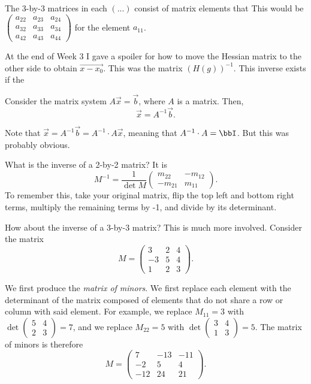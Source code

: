 \documentclass[a4paper, 12pt,oneside,openany]{book}
\begin{document}
The 3-by-3 matrices in each $(...)$ consist of matrix elements that  This would be $\begin{pmatrix} a_{22} & a_{23} & a_{24} \\ a_{32} & a_{33} & a_{34} \\ a_{42} & a_{43} & a_{44} \end{pmatrix}$ for the element $a_{11}$.

At the end of Week 3 I gave a spoiler for how to move the Hessian matrix to the other side to obtain $\overrightarrow{x-x_0}$. This was the matrix $(H(g))^{-1}$. This inverse exists if the 

Consider the matrix system $A\vec{x} = \vec{b}$, where $A$ is a matrix. Then, $$\vec{x} = A^{-1} \vec{b}.$$

Note that $\vec{x} = A^{-1} \vec{b} = A^{-1} \cdot A\vec{x}$, meaning that $A^{-1} \cdot A = \bbI$. But this was probably obvious. 

What is the inverse of a 2-by-2 matrix? It is $$M^{-1} = \frac{1}{\det{M}} \begin{pmatrix} m_{22} & -m_{12} \\ -m_{21} & m_{11}\end{pmatrix}.$$ To remember this, take your original matrix, flip the top left and bottom right terms, multiply the remaining terms by -1, and divide by its determinant.

How about the inverse of a 3-by-3 matrix? This is much more involved. Consider the matrix $$M= \begin{pmatrix} 3 & 2 & 4 \\ -3 & 5 & 4 \\ 1 & 2 & 3 \end{pmatrix}.$$

We first produce the \emph{matrix of minors}. We first replace each element with the determinant of the matrix composed of elements that do not share a row or column with said element. For example, we replace $M_{11}=3$ with $\det \begin{pmatrix} 5 & 4 \\ 2 & 3 \end{pmatrix}  = 7$, and we replace $M_{22}=5$ with $\det \begin{pmatrix} 3 & 4 \\ 1 & 3 \end{pmatrix}  = 5.$ The matrix of minors is therefore $$M= \begin{pmatrix} 7 & -13 & -11 \\ -2 & 5 & 4 \\ -12 & 24 & 21 \end{pmatrix}.$$ 
\end{document}
